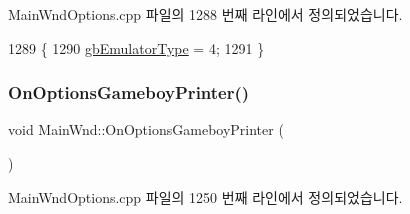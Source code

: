 Main\+Wnd\+Options.\+cpp 파일의 1288 번째 라인에서 정의되었습니다.


\begin{DoxyCode}
1289 \{
1290   \mbox{\hyperlink{gb_globals_8cpp_aab449ed6ecf2bd502928a3d5aa5c54c4}{gbEmulatorType}} = 4;
1291 \}
\end{DoxyCode}
\mbox{\label{class_main_wnd_a5909d22b4cea6315004fc60b0f997b23}} 
\subsubsection{\texorpdfstring{On\+Options\+Gameboy\+Printer()}{OnOptionsGameboyPrinter()}}
{\footnotesize\ttfamily void Main\+Wnd\+::\+On\+Options\+Gameboy\+Printer (\begin{DoxyParamCaption}{ }\end{DoxyParamCaption})\hspace{0.3cm}{\ttfamily [protected]}}



Main\+Wnd\+Options.\+cpp 파일의 1250 번째 라인에서 정의되었습니다.


